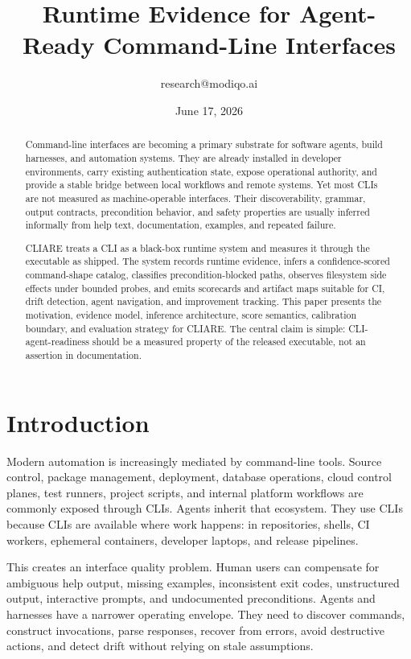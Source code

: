 \documentclass[11pt]{article}
\title{Runtime Evidence for Agent-Ready Command-Line Interfaces}
\author{research@modiqo.ai}
\date{June 17, 2026}
\begin{document}
\maketitle

\begin{abstract}
Command-line interfaces are becoming a primary substrate for software agents, build harnesses, and automation systems. They are already installed in developer environments, carry existing authentication state, expose operational authority, and provide a stable bridge between local workflows and remote systems. Yet most CLIs are not measured as machine-operable interfaces. Their discoverability, grammar, output contracts, precondition behavior, and safety properties are usually inferred informally from help text, documentation, examples, and repeated failure.

CLIARE treats a CLI as a black-box runtime system and measures it through the executable as shipped. The system records runtime evidence, infers a confidence-scored command-shape catalog, classifies precondition-blocked paths, observes filesystem side effects under bounded probes, and emits scorecards and artifact maps suitable for CI, drift detection, agent navigation, and improvement tracking. This paper presents the motivation, evidence model, inference architecture, score semantics, calibration boundary, and evaluation strategy for CLIARE. The central claim is simple: CLI-agent-readiness should be a measured property of the released executable, not an assertion in documentation.
\end{abstract}

\section{Introduction}

Modern automation is increasingly mediated by command-line tools. Source control, package management, deployment, database operations, cloud control planes, test runners, project scripts, and internal platform workflows are commonly exposed through CLIs. Agents inherit that ecosystem. They use CLIs because CLIs are available where work happens: in repositories, shells, CI workers, ephemeral containers, developer laptops, and release pipelines.

This creates an interface quality problem. Human users can compensate for ambiguous help output, missing examples, inconsistent exit codes, unstructured output, interactive prompts, and undocumented preconditions. Agents and harnesses have a narrower operating envelope. They need to discover commands, construct invocations, parse responses, recover from errors, avoid destructive actions, and detect drift without relying on stale assumptions.
\end{document}
